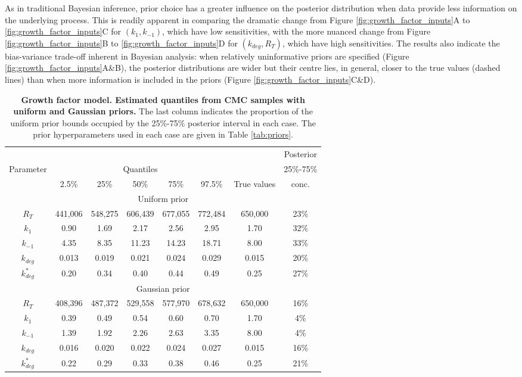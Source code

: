 As in traditional Bayesian inference, prior choice has a greater influence on the posterior distribution when data provide less information on the underlying process. This is readily apparent in comparing the dramatic change from Figure \ref{fig:growth_factor_inputs}A to \ref{fig:growth_factor_inputs}C for $(k_1,k_{-1})$, which have low sensitivities, with the more nuanced change from Figure \ref{fig:growth_factor_inputs}B to \ref{fig:growth_factor_inputs}D for $(k_{deg},R_T)$, which have high sensitivities. The results also indicate the bias-variance trade-off inherent in Bayesian analysis: when relatively uninformative priors are specified (Figure \ref{fig:growth_factor_inputs}A\&B), the posterior distributions are wider but their centre lies, in general, closer to the true values (dashed lines) than when more information is included in the priors (Figure \ref{fig:growth_factor_inputs}C\&D).

\begin{table}
	\scriptsize
\begin{tabular}{c|ccccc|c|c}
\toprule
&&&&&&&                                         Posterior \\
Parameter &  \multicolumn{5}{c}{Quantiles} &&  25\%-75\% \\
          & 2.5\% & 25\% & 50\% & 75\% & 97.5\% & True values & conc.\\
\toprule
\multicolumn{8}{c}{Uniform prior} \\
\toprule
$R_T$       &  441,006 & 548,275 & 606,439 & 677,055 & 772,484 & 650,000 & 23\%\\
$k_1$       &  0.90 & 1.69 & 2.17 & 2.56 & 2.95 & 1.70 & 32\%\\
$k_{-1}$    & 4.35 & 8.35 & 11.23 & 14.23 & 18.71 & 8.00 & 33\%\\
$k_{deg}$   & 0.013 & 0.019 & 0.021 & 0.024 & 0.029 & 0.015 & 20\%\\
$k^*_{deg}$ & 0.20 & 0.34 & 0.40 & 0.44 & 0.49 & 0.25 & 27\%\\
\toprule
\multicolumn{8}{c}{Gaussian prior} \\
\toprule
$R_T$       & 408,396 & 487,372 & 529,558 & 577,970 & 678,632 & 650,000 & 16\%\\
$k_1$       & 0.39 & 0.49 & 0.54 & 0.60 & 0.70 & 1.70 & 4\%\\
$k_{-1}$    & 1.39 & 1.92 & 2.26 & 2.63 & 3.35 & 8.00 & 4\%\\
$k_{deg}$   & 0.016 & 0.020 & 0.022 & 0.024 & 0.027 & 0.015 & 16\%\\
$k^*_{deg}$ & 0.22 & 0.29 & 0.33 & 0.38 & 0.46 & 0.25 & 21\%\\
\end{tabular}
\caption{\textbf{Growth factor model. Estimated quantiles from CMC samples with uniform and Gaussian priors.} The last column indicates the proportion of the uniform prior bounds occupied by the 25\%-75\% posterior interval in each case. The prior hyperparameters used in each case are given in Table \ref{tab:priors}.}
\label{tab:growth_factor_results}
\end{table}

